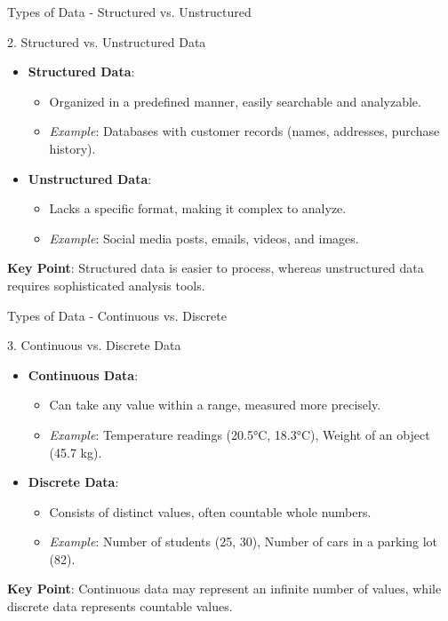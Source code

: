 \documentclass[aspectratio=169]{beamer}
\begin{document}
\begin{frame}[fragile]{Types of Data - Structured vs. Unstructured}
    \begin{block}{2. Structured vs. Unstructured Data}
        \begin{itemize}
            \item \textbf{Structured Data}: 
                \begin{itemize}
                    \item Organized in a predefined manner, easily searchable and analyzable.
                    \item \textit{Example}: Databases with customer records (names, addresses, purchase history).
                \end{itemize}
            \item \textbf{Unstructured Data}: 
                \begin{itemize}
                    \item Lacks a specific format, making it complex to analyze.
                    \item \textit{Example}: Social media posts, emails, videos, and images.
                \end{itemize}
        \end{itemize}
        \textbf{Key Point}: Structured data is easier to process, whereas unstructured data requires sophisticated analysis tools.
    \end{block}
\end{frame}

\begin{frame}[fragile]{Types of Data - Continuous vs. Discrete}
    \begin{block}{3. Continuous vs. Discrete Data}
        \begin{itemize}
            \item \textbf{Continuous Data}:
                \begin{itemize}
                    \item Can take any value within a range, measured more precisely.
                    \item \textit{Example}: Temperature readings (20.5°C, 18.3°C), Weight of an object (45.7 kg).
                \end{itemize}
            \item \textbf{Discrete Data}:
                \begin{itemize}
                    \item Consists of distinct values, often countable whole numbers.
                    \item \textit{Example}: Number of students (25, 30), Number of cars in a parking lot (82).
                \end{itemize}
        \end{itemize}
        \textbf{Key Point}: Continuous data may represent an infinite number of values, while discrete data represents countable values.
    \end{block}
\end{frame}
\end{document}
